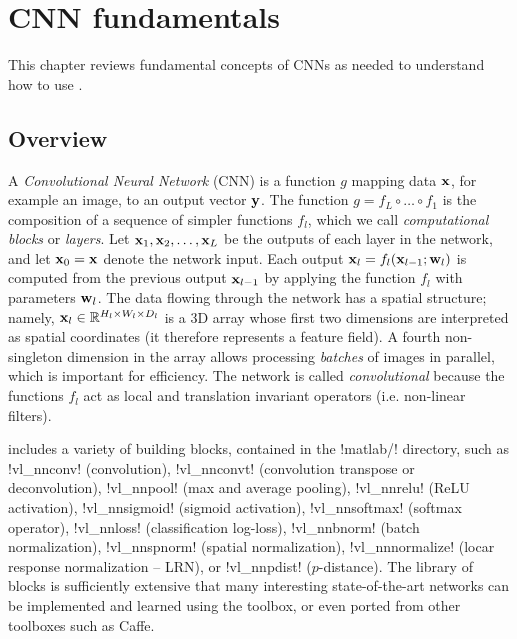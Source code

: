 \chapter{CNN fundamentals}\label{s:fundamentals}

This chapter reviews fundamental concepts of CNNs as needed to understand how to use \matconvnet.

\section{Overview}\label{s:cnn-structure}

A \emph{Convolutional Neural Network} (CNN) is a function $g$ mapping data $\mathbf{x}$, for example an image, to an output vector $\mathbf{y}$. The function $g=f_L \circ \dots \circ f_1$ is the composition of a sequence of simpler functions $f_l$, which we  call \emph{computational blocks} or \emph{layers}.  Let $\mathbf{x}_1,\mathbf{x}_2,\dots,\mathbf{x}_L$ be the outputs of each layer in the network, and let $\mathbf{x}_0=\mathbf{x}$ denote the network input. Each output $\mathbf{x}_l = f_l(\mathbf{x}_{l-1};\mathbf{w}_l)$ is computed from the previous output $\mathbf{x}_{l-1}$  by applying the function $f_l$ with parameters $\mathbf{w}_l$. The data flowing through the network has a spatial structure; namely,  $\mathbf{x}_l\in\mathbb{R}^{H_l \times W_l \times D_l}$ is a 3D array whose first two dimensions are interpreted as spatial coordinates (it therefore represents a feature field).  A fourth non-singleton dimension in the array allows processing \emph{batches} of images in parallel, which is important for efficiency. The network is called \emph{convolutional} because the functions $f_l$ act as local and translation invariant operators (i.e. non-linear filters). 

\matlab includes a variety of  building blocks, contained in the !matlab/! directory, such as !vl_nnconv! (convolution), !vl_nnconvt! (convolution transpose or deconvolution), !vl_nnpool! (max and average pooling), !vl_nnrelu! (ReLU activation), !vl_nnsigmoid! (sigmoid activation), !vl_nnsoftmax! (softmax operator), !vl_nnloss! (classification log-loss), !vl_nnbnorm! (batch normalization), !vl_nnspnorm! (spatial normalization), !vl_nnnormalize! (locar response normalization -- LRN), or !vl_nnpdist! ($p$-distance).  The library of blocks is sufficiently extensive that many interesting state-of-the-art networks can be implemented and learned using the toolbox, or even ported from other toolboxes such as Caffe.


